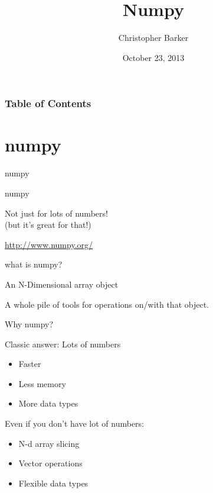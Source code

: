 \documentclass{beamer}
\title[Intro to Python]{Numpy}
\author{Christopher Barker}
\institute{IRIS}
\date{October 23, 2013}
\begin{document}
\begin{frame}
  \titlepage
\end{frame}

\begin{frame}
\frametitle{Table of Contents}
  \tableofcontents
\end{frame}

\section{numpy}

\begin{frame}[fragile]{numpy}

\vfill
\begin{center}
{\LARGE numpy}

\vfill
{\Large Not just for lots of numbers!\\[0.1in]
(but it's great for that!)}
\end{center}
\vfill
\url{http://www.numpy.org/}
\end{frame} 


\begin{frame}[fragile]{what is numpy?}

{\Large An N-Dimensional array object}

\vfill
{\Large A whole pile of tools for operations on/with that object.}

\vfill

\end{frame} 

\begin{frame}[fragile]{Why numpy?}

{\Large Classic answer: Lots of numbers}

\vfill
\begin{itemize}
  \item Faster
  \item Less memory
  \item More data types
\end{itemize}


\vfill
{\Large Even if you don't have lot of numbers:}
\begin{itemize}
  \item N-d array slicing
  \item Vector operations
  \item Flexible data types
\end{itemize}

\end{frame} 
\end{document}
